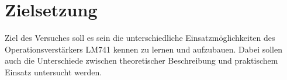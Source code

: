 \section{Zielsetzung}
\label{sec:ziel}
Ziel des Versuches soll es sein die unterschiedliche Einsatzmöglichkeiten des Operationsverstärkers
LM741 kennen zu lernen und aufzubauen. Dabei sollen auch die Unterschiede zwischen theoretischer 
Beschreibung und praktischem Einsatz untersucht werden.
